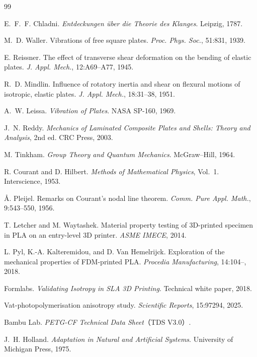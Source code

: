 \documentclass[11pt,a4paper]{article}
\begin{document}
\begin{thebibliography}{99}
\setlength{\itemsep}{2pt}

 E.~F.~F. Chladni. \textit{Entdeckungen \"uber die Theorie
des Klanges}. Leipzig, 1787.

 M.~D. Waller. Vibrations of free square plates.
\textit{Proc. Phys. Soc.}, 51:831, 1939.

 E. Reissner. The effect of transverse shear deformation on
the bending of elastic plates. \textit{J. Appl. Mech.}, 12:A69--A77, 1945.

 R.~D. Mindlin. Influence of rotatory inertia and shear on
flexural motions of isotropic, elastic plates. \textit{J. Appl. Mech.},
18:31--38, 1951.

 A.~W. Leissa. \textit{Vibration of Plates}. NASA SP-160,
1969.

 J.~N. Reddy. \textit{Mechanics of Laminated Composite Plates
and Shells: Theory and Analysis}, 2nd ed. CRC Press, 2003.

 M. Tinkham. \textit{Group Theory and Quantum Mechanics}.
McGraw--Hill, 1964.

 R. Courant and D. Hilbert. \textit{Methods of Mathematical
Physics}, Vol.~1. Interscience, 1953.

 \r{A}. Pleijel. Remarks on Courant's nodal line theorem.
\textit{Comm. Pure Appl. Math.}, 9:543--550, 1956.

 T. Letcher and M. Waytashek. Material property testing of
3D-printed specimen in PLA on an entry-level 3D printer. \textit{ASME IMECE},
2014.

 L. Pyl, K.-A. Kalteremidou, and D. Van Hemelrijck. Exploration
of the mechanical properties of FDM-printed PLA. \textit{Procedia Manufacturing},
14:104--, 2018.

 Formlabs. \textit{Validating Isotropy in SLA 3D Printing}.
Technical white paper, 2018.

 Vat-photopolymerisation anisotropy study.
\textit{Scientific Reports}, 15:97294, 2025.

 Bambu Lab. \textit{PETG-CF Technical Data Sheet}（TDS V3.0）.

 J.~H. Holland. \textit{Adaptation in Natural and Artificial
Systems}. University of Michigan Press, 1975.


\end{thebibliography}
\end{document}
